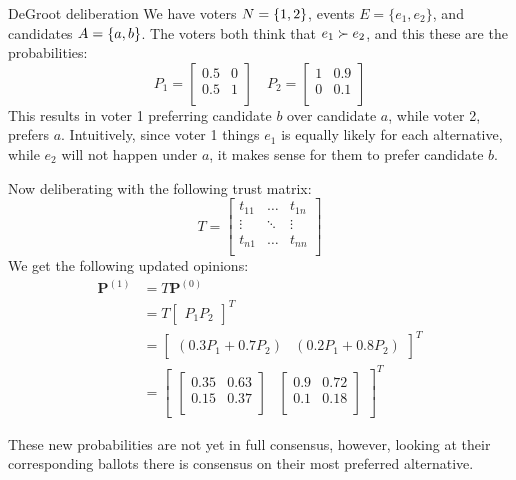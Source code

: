 \begin{example}{DeGroot deliberation}
	{}
	We have voters \(N = \{1,2\}\), events \(E = \{e_{1}, e_{2}\}\), and candidates \(A = \{a,b\}\). The voters both think that \(e_{1} \succ e_{2}\), and this these are the probabilities:
	\[
		P_1 =\begin{bmatrix}
			0.5 & 0 \\
			0.5 & 1 \\
		\end{bmatrix}\quad
		P_2 =\begin{bmatrix}
			1 & 0.9 \\
			0 & 0.1 \\
		\end{bmatrix}
	\]
	This results in voter 1 preferring candidate $b$ over candidate $a$, while voter 2, prefers $a$. Intuitively, since voter 1 things $e_{1}$ is equally likely for each alternative, while $e_{2}$ will not happen under $a$, it makes sense for them to prefer candidate $b$.

	Now deliberating with the following trust matrix:
	\[
		T=\begin{bmatrix}
			t_{11} & \dots  & t_{1n} \\
			\vdots & \ddots & \vdots \\
			t_{n1} & \dots  & t_{nn} \\
		\end{bmatrix}
	\]
	We get the following updated opinions:
	\begin{align*}
		\boldsymbol{P}^{(1)} & = T\boldsymbol{P}^{(0)}                                                    \\
		                     & =T\begin{bmatrix}P_1 P_2\end{bmatrix}^{T}                                  \\
		                     & =\begin{bmatrix}(0.3P_1 + 0.7P_{2}) & (0.2P_1 + 0.8P_{2})\end{bmatrix}^{T} \\
		                     & = \begin{bmatrix}
			                         \begin{bmatrix}
				0.35 & 0.63 \\
				0.15 & 0.37 \\
			\end{bmatrix} &
			                         \begin{bmatrix}
				0.9 & 0.72 \\
				0.1 & 0.18 \\
			\end{bmatrix}
		                         \end{bmatrix}^{T}
	\end{align*}

	These new probabilities are not yet in full consensus, however, looking at their corresponding ballots there is consensus on their most preferred alternative.
	\label{example:deGroot-delib}
\end{example}

